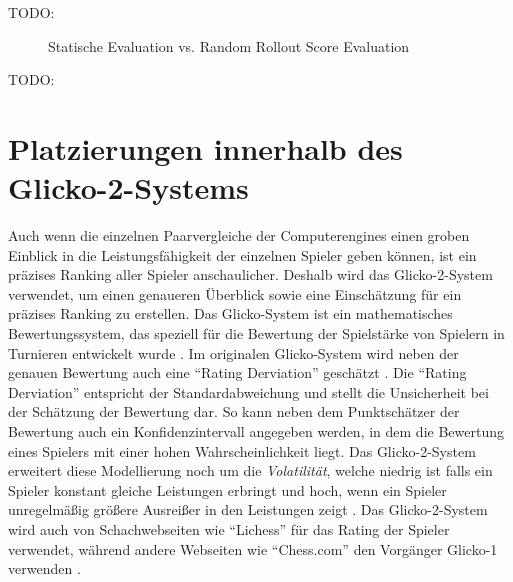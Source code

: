 TODO:

\begin{figure}[!ht]
    \centering
    \caption{Statische Evaluation vs. Random Rollout Score Evaluation}
    \label{fig:greedy-static-greedy-score-comparison}
\end{figure}

TODO:

\section{Platzierungen innerhalb des Glicko-2-Systems}

Auch wenn die einzelnen Paarvergleiche der Computerengines einen groben Einblick in die Leistungsfähigkeit der einzelnen Spieler geben können, ist ein präzises Ranking aller Spieler anschaulicher. Deshalb wird das Glicko-2-System verwendet, um einen genaueren Überblick sowie eine Einschätzung für ein präzises Ranking zu erstellen. Das Glicko-System ist ein mathematisches Bewertungssystem, das speziell für die Bewertung der Spielstärke von Spielern in Turnieren entwickelt wurde \cite[S. 377]{1999.GlickoMath}. Im originalen Glicko-System wird neben der genauen Bewertung auch eine \enquote{Rating Derviation} geschätzt \cite[S. 1f.]{2016.Glicko}. Die \enquote{Rating Derviation} entspricht der Standardabweichung und stellt die Unsicherheit bei der Schätzung der Bewertung dar. So kann neben dem Punktschätzer der Bewertung auch ein Konfidenzintervall angegeben werden, in dem die Bewertung eines Spielers mit einer hohen Wahrscheinlichkeit liegt. Das Glicko-2-System erweitert diese Modellierung noch um die \emph{Volatilität}, welche niedrig ist falls ein Spieler konstant gleiche Leistungen erbringt und hoch, wenn ein Spieler unregelmäßig größere Ausreißer in den Leistungen zeigt \cite[S. 1]{2022.Glicko2}. Das Glicko-2-System wird auch von Schachwebseiten wie \enquote{Lichess} für das Rating der Spieler verwendet, während andere Webseiten wie \enquote{Chess.com} den Vorgänger Glicko-1 verwenden \cite{2024.ChessRatingSystems}.

